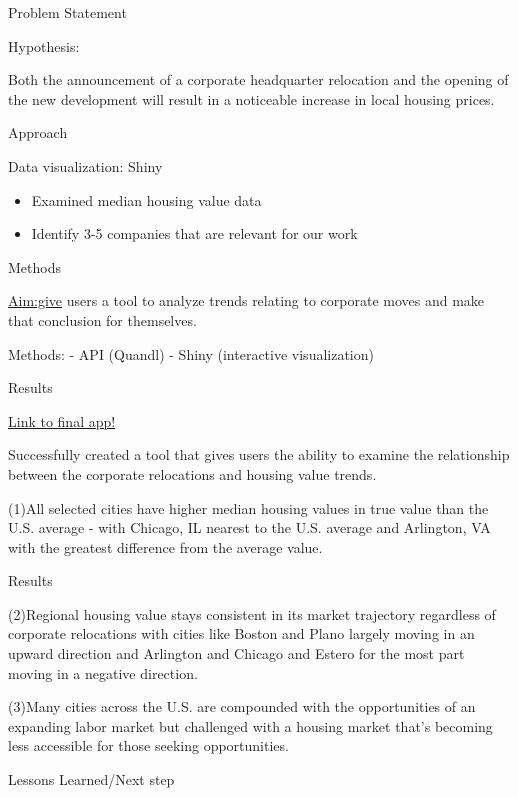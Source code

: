 \documentclass[ignorenonframetext,]{beamer}
\providecommand{\tightlist}{%
  \setlength{\itemsep}{0pt}\setlength{\parskip}{0pt}}
\begin{document}
\begin{frame}{Problem Statement}

Hypothesis:

Both the announcement of a corporate headquarter relocation and the
opening of the new development will result in a noticeable increase in
local housing prices.

\end{frame}

\begin{frame}{Approach}

Data visualization: Shiny

\begin{itemize}
\tightlist
\item
  Examined median housing value data
\item
  Identify 3-5 companies that are relevant for our work
\end{itemize}

\end{frame}

\begin{frame}{Methods}

\url{Aim:give} users a tool to analyze trends relating to corporate
moves and make that conclusion for themselves.

Methods: - API (Quandl) - Shiny (interactive visualization)

\end{frame}

\begin{frame}{Results}

\href{https://ben-monticello.shinyapps.io/ProjectApp/}{Link to final
app!}

Successfully created a tool that gives users the ability to examine the
relationship between the corporate relocations and housing value trends.

(1)All selected cities have higher median housing values in true value
than the U.S. average - with Chicago, IL nearest to the U.S. average and
Arlington, VA with the greatest difference from the average value.

\end{frame}

\begin{frame}{Results}

(2)Regional housing value stays consistent in its market trajectory
regardless of corporate relocations with cities like Boston and Plano
largely moving in an upward direction and Arlington and Chicago and
Estero for the most part moving in a negative direction.

(3)Many cities across the U.S. are compounded with the opportunities of
an expanding labor market but challenged with a housing market that's
becoming less accessible for those seeking opportunities.

\end{frame}

\begin{frame}{Lessons Learned/Next step}

\end{frame}
\end{document}
